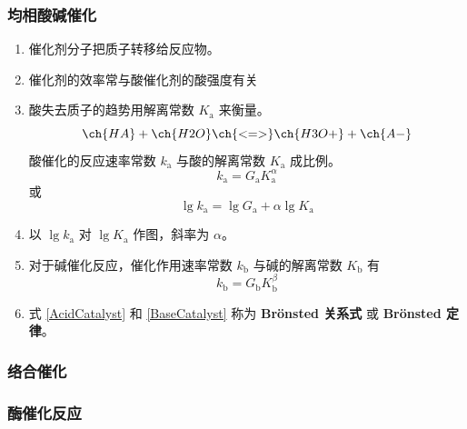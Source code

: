 \subsubsection{均相酸碱催化}

\begin{enumerate}
    \item 催化剂分子把质子转移给反应物。
    \item 催化剂的效率常与酸催化剂的酸强度有关
    \item 酸失去质子的趋势用解离常数 $K_\mathrm{a}$ 来衡量。
    \begin{equation*}
        \ch{HA} + \ch{H2O} \ch{<=>} \ch{H3O+} + \ch{A-}
    \end{equation*}
    酸催化的反应速率常数 $k_\mathrm{a}$ 与酸的解离常数 $K_\mathrm{a}$ 成比例。
    \begin{equation}
        k_\mathrm{a} = G_\mathrm{a} K_\mathrm{a}^{\alpha}
        \label{AcidCatalyst}
    \end{equation}
    或
    \begin{equation}
        \lg{k_\mathrm{a}} = \lg{G_\mathrm{a}} + \alpha \lg{K_\mathrm{a}}
    \end{equation}
    \item 以 $\lg{k_\mathrm{a}}$ 对 $\lg{K_\mathrm{a}}$ 作图，斜率为 $\alpha$。
    \item 对于碱催化反应，催化作用速率常数 $k_\mathrm{b}$ 与碱的解离常数 $K_\mathrm{b}$ 有
    \begin{equation}
        k_\mathrm{b} = G_\mathrm{b} K_\mathrm{b}^{\beta}
        \label{BaseCatalyst}
    \end{equation}
    \item 式 \eqref{AcidCatalyst} 和 \eqref{BaseCatalyst} 称为 \textbf{Brönsted 关系式} 或 \textbf{Brönsted 定律}。
\end{enumerate}

\subsubsection{络合催化}

\subsubsection{酶催化反应}


